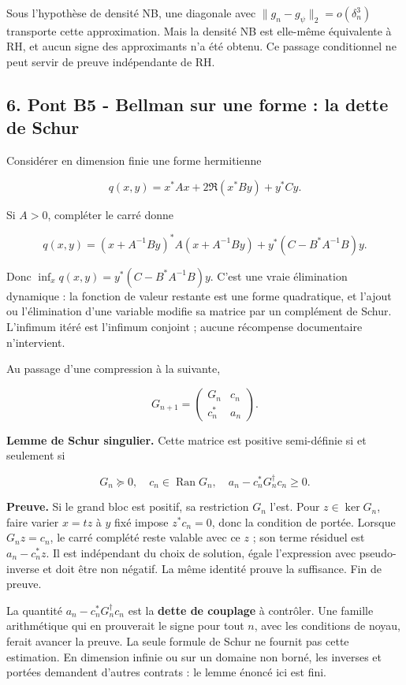 \documentclass[
  10pt,
  a4paper,
]{article}
\begin{document}
Sous l'hypothèse de densité NB, une diagonale avec
\(\|g_n-g_\psi\|_2=o(\delta_n^3)\) transporte cette approximation. Mais
la densité NB est elle-même équivalente à RH, et aucun signe des
approximants n'a été obtenu. Ce passage conditionnel ne peut servir de
preuve indépendante de RH.

\newpage

\hypertarget{pont-b5---bellman-sur-une-forme-la-dette-de-schur}{%
\subsection{6. Pont B5 - Bellman sur une forme : la dette de
Schur}\label{pont-b5---bellman-sur-une-forme-la-dette-de-schur}}

Considérer en dimension finie une forme hermitienne

\[
q(x,y)=x^*Ax+2\Re(x^*By)+y^*Cy.
\]

Si \(A>0\), compléter le carré donne

\[
q(x,y)=(x+A^{-1}By)^*A(x+A^{-1}By)
+y^*(C-B^*A^{-1}B)y.
\]

Donc \(\inf_x q(x,y)=y^*(C-B^*A^{-1}B)y\). C'est une vraie élimination
dynamique : la fonction de valeur restante est une forme quadratique, et
l'ajout ou l'élimination d'une variable modifie sa matrice par un
complément de Schur. L'infimum itéré est l'infimum conjoint ; aucune
récompense documentaire n'intervient.

Au passage d'une compression à la suivante,

\[
G_{n+1}=\begin{pmatrix}G_n&c_n\\c_n^*&a_n\end{pmatrix}.
\]

\textbf{Lemme de Schur singulier.} Cette matrice est positive
semi-définie si et seulement si

\[
G_n\succeq0,\quad c_n\in\operatorname{Ran}G_n,\quad
a_n-c_n^*G_n^\dagger c_n\ge0.
\]

\textbf{Preuve.} Si le grand bloc est positif, sa restriction \(G_n\)
l'est. Pour \(z\in\ker G_n\), faire varier \(x=tz\) à \(y\) fixé impose
\(z^*c_n=0\), donc la condition de portée. Lorsque \(G_nz=c_n\), le
carré complété reste valable avec ce \(z\) ; son terme résiduel est
\(a_n-c_n^*z\). Il est indépendant du choix de solution, égale
l'expression avec pseudo-inverse et doit être non négatif. La même
identité prouve la suffisance. Fin de preuve.

La quantité \(a_n-c_n^*G_n^\dagger c_n\) est la \textbf{dette de
couplage} à contrôler. Une famille arithmétique qui en prouverait le
signe pour tout \(n\), avec les conditions de noyau, ferait avancer la
preuve. La seule formule de Schur ne fournit pas cette estimation. En
dimension infinie ou sur un domaine non borné, les inverses et portées
demandent d'autres contrats : le lemme énoncé ici est fini.
\end{document}
